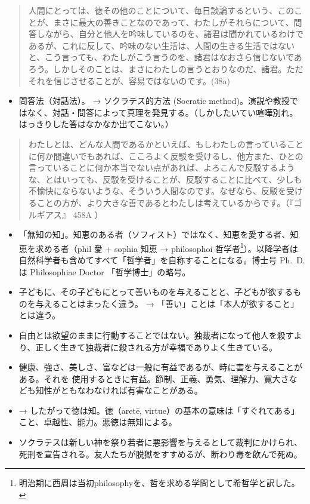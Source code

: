 \documentclass[uplatex,dvipdfmx]{jsarticle} \usepackage{mystyle}%
\begin{document}
  \begin{quote}
    人間にとっては、徳その他のことについて、毎日談論するという、このことが、まさに最大の善きことなのであって、わたしがそれらについて、問答しながら、自分と他人を吟味しているのを、諸君は聞かれているわけであるが、これに反して、吟味のない生活は、人間の生きる生活ではないと、こう言っても、わたしがこう言うのを、諸君はなおさら信じないであろう。しかしそのことは、まさにわたしの言うとおりなのだ、諸君。ただそれを信じさせることが、容易ではないのです。(38a)
  \end{quote}
  \begin{itemize}

\item 問答法（対話法）。 → ソクラテス的方法 (Socratic method)。演説や教授ではなく、対話・問答によって真理を発見する。（しかしたいてい喧嘩別れ。はっきりした答はなかなか出てこない。）
\end{itemize}

  \begin{quote}
     わたしとは、どんな人間であるかといえば、もしわたしの言っていることに何か間違いでもあれば、こころよく反駁を受けるし、他方また、ひとの言っていることに何か本当でない点があれば、よろこんで反駁するような、とはいっても、反駁を受けることが、反駁することに比べて、少しも不愉快にならないような、そういう人間なのです。なぜなら、反駁を受けることの方が、より大きな善であるとわたしは考えているからです。（『ゴルギアス』 458A ）
  \end{quote}
\begin{itemize}

\item 「無知の知」。知恵のある者（ソフィスト）ではなく、知恵を愛する者、知恵を求める者（phil 愛 + sophia 知恵 → philosophoi 哲学者\footnote{明治期に西周は当初philosophyを、哲を求める学問として希哲学と訳した。}）。以降学者は自然科学者も含めてすべて「哲学者」を自称することになる。博士号 Ph.~D.は Philosophiae Doctor 「哲学博士」の略号。

\item 子どもに、その子どもにとって善いものを与えることと、子どもが欲するものを与えることはまったく違う。 → 「善い」ことは「本人が欲すること」とは違う。

\item 自由とは欲望のままに行動することではない。独裁者になって他人を殺すより、正しく生きて独裁者に殺される方が幸福でありよく生きている。

\item 健康、強さ、美しさ、富などは一般に有益であるが、時に害を与えることがある。それを 使用するときに有益。節制、正義、勇気、理解力、寛大さなども知性がともなわなければ有害なことがある。

\item   → したがって徳は知。徳（aret\={e}, virtue）の基本の意味は「すぐれてある」こと、卓越性、能力。悪徳は無知による。

\item ソクラテスは新しい神を祭り若者に悪影響を与えるとして裁判にかけられ、死刑を宣告される。友人たちが脱獄をすすめるが、断わり毒を飲んで死ぬ。

\end{itemize}
\end{document}
